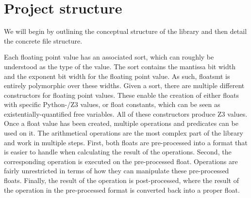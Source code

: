 \documentclass[a4paper,UKenglish,cleveref, autoref, thm-restate]{lipics-v2019}
\begin{document}
\section{Project structure}
We will begin by outlining the conceptual structure of the library and then detail the concrete file structure. 

Each floating point value has an associated sort, which can roughly be understood as the type of the value. The sort contains the mantissa bit width and the exponent bit width for the floating point value. As such, floatsmt is entirely polymorphic over these widths. 
Given a sort, there are multiple different constructors for floating point values. These enable the creation of either floats with specific Python-/Z3 values, or float constants, which can be seen as existentially-quantified free variables. All of these constructors produce Z3 values.
Once a float value has been created, multiple operations and predicates can be used on it. The arithmetical operations are the most complex part of the library and work in multiple steps. First, both floats are pre-processed into a format that is easier to handle when calculating the result of the operations. Second, the corresponding operation is executed on the pre-processed float. Operations are fairly unrestricted in terms of how they can manipulate these pre-processed floats. Finally, the result of the operation is post-processed, where the result of the operation in the pre-processed format is converted back into a proper float.
\end{document}
